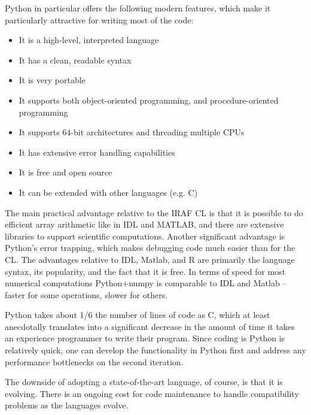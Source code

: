 \documentclass[letterpaper,10pt,english]{sphinxmanual}
\begin{document}
Python in particular offers the following modern features, which make
it particularly attractive for writing most of the code:
\begin{itemize}
\item {} 
It is a high-level, interpreted language

\item {} 
It has a clean, readable syntax

\item {} 
It is very portable

\item {} 
It supports both object-oriented programming, and procedure-oriented programming

\item {} 
It supports 64-bit architectures and threading multiple CPUs

\item {} 
It has extensive error handling capabilities

\item {} 
It is free and open source

\item {} 
It can be extended with other languages (e.g. C)

\end{itemize}

The main practical advantage relative to the IRAF CL is that it is possible
to do efficient array arithmetic like in IDL and MATLAB, and there are extensive libraries
to support scientific computations. Another significant advantage is Python's
error trapping, which makes debugging code much easier than for the CL.
The advantages relative to IDL, Matlab, and R are primarily the language syntax,
its popularity, and the fact that it is free. In terms of speed for most
numerical computations Python+numpy is comparable to IDL and Matlab --
faster for some operations, slower for others.

Python takes about 1/6 the number of lines of code as C, which at least
anecdotally translates into a significant decrease in the amount of time
it takes an experience programmer to write their program. Since coding
is Python is relatively quick, one can develop the functionality in Python
first and address any performance bottlenecks on the second iteration.

The downside of adopting a state-of-the-art language, of course, is that it is evolving.
There is an ongoing cost for code maintenance to handle compatibility problems
as the languages evolve.
\end{document}
